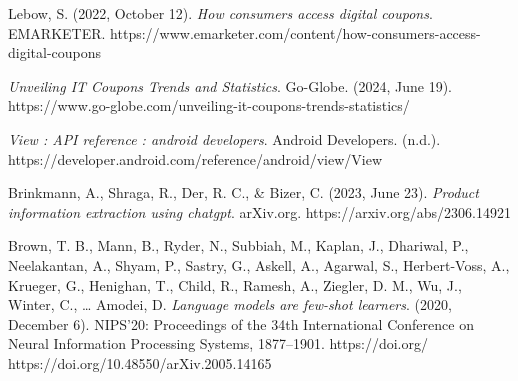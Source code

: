 \documentclass[licencjacka,en]{pracamgr}
\begin{document}
\begin{thebibliography}{99}

Lebow, S. (2022, October 12). \textit{How consumers access digital coupons}. EMARKETER. https://www.emarketer.com/content/how-consumers-access-digital-coupons

\textit{Unveiling IT Coupons Trends and Statistics}. Go-Globe. (2024, June 19). https://www.go-globe.com/unveiling-it-coupons-trends-statistics/

\textit{View :  API reference :  android developers}. Android Developers. (n.d.). https://developer.android.com/reference/android/view/View

Brinkmann, A., Shraga, R., Der, R. C., \& Bizer, C. (2023, June 23). \textit{Product information extraction using chatgpt}. arXiv.org. https://arxiv.org/abs/2306.14921

Brown, T. B., Mann, B., Ryder, N., Subbiah, M., Kaplan, J., Dhariwal, P., Neelakantan, A., Shyam, P., Sastry, G., Askell, A., Agarwal, S., Herbert-Voss, A., Krueger, G., Henighan, T., Child, R., Ramesh, A., Ziegler, D. M., Wu, J., Winter, C., … Amodei, D. \textit{Language models are few-shot learners}. (2020, December 6). NIPS’20: Proceedings of the 34th International Conference on Neural Information Processing Systems, 1877–1901. https://doi.org/ https://doi.org/10.48550/arXiv.2005.14165


\end{thebibliography}
\end{document}
